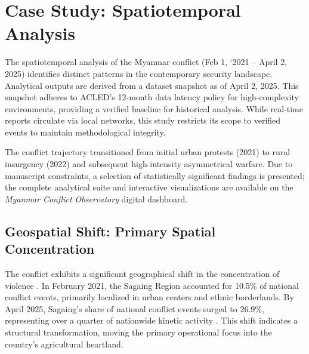 \documentclass[conference]{IEEEtran}
\begin{document}
\section{Case Study: Spatiotemporal Analysis}

The spatiotemporal analysis of the Myanmar conflict (Feb 1, `2021 – April 2, 2025) identifies distinct patterns in the contemporary security landscape. Analytical outputs are derived from a dataset snapshot as of April 2, 2025. This snapshot adheres to ACLED’s 12-month data latency policy for high-complexity environments, providing a verified baseline for historical analysis. While real-time reports circulate via local networks, this study restricts its scope to verified events to maintain methodological integrity.

The conflict trajectory transitioned from initial urban protests (2021) to rural insurgency (2022) and subsequent high-intensity asymmetrical warfare. Due to manuscript constraints, a selection of statistically significant findings is presented; the complete analytical suite and interactive visualizations are available on the \textit{Myanmar Conflict Observatory} digital dashboard.
\subsection{Geospatial Shift: Primary Spatial Concentration}
The conflict exhibits a significant geographical shift in the concentration of violence \cite{shcc2023myanmar,idler2023conflict}. In February 2021, the Sagaing Region accounted for 10.5\% of national conflict events, primarily localized in urban centers and ethnic borderlands. By April 2025, Sagaing's share of national conflict events surged to 26.9\%, representing over a quarter of nationwide kinetic activity \cite{acled2023myanmar}. This shift indicates a structural transformation, moving the primary operational focus into the country's agricultural heartland.
\end{document}
